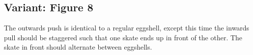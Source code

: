 \subsection*{Variant: Figure 8}
\label{drill:sticky/eggshells/figure_8}

The outwards push is identical to a regular eggshell, except this time the inwards pull should be staggered such that one skate ends up in front of the other.  
The skate in front should alternate between eggshells. 
